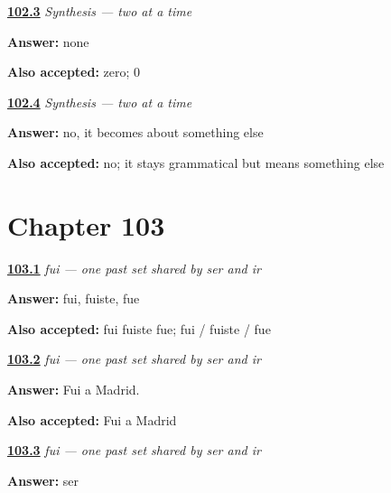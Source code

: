 \noindent\begin{minipage}[t]{\linewidth}
\raggedright
\hyperlink{review-ES-C47-sintesis-dos-a-la-vez-count}{\textbf{102.3}} \emph{Synthesis — two at a time}\par
\small \textbf{Answer:} none\par
\footnotesize \textbf{Also accepted:} zero; 0
\end{minipage}\par\medskip

\noindent\begin{minipage}[t]{\linewidth}
\raggedright
\hyperlink{review-ES-C47-sintesis-dos-a-la-vez-cost}{\textbf{102.4}} \emph{Synthesis — two at a time}\par
\small \textbf{Answer:} no, it becomes about something else\par
\footnotesize \textbf{Also accepted:} no; it stays grammatical but means something else
\end{minipage}\par\medskip

\section*{Chapter 103}

\noindent\begin{minipage}[t]{\linewidth}
\raggedright
\hyperlink{review-ES-C14-ser-ir-preterite-singular-forms}{\textbf{103.1}} \emph{fui — one past set shared by ser and ir}\par
\small \textbf{Answer:} fui, fuiste, fue\par
\footnotesize \textbf{Also accepted:} fui fuiste fue; fui / fuiste / fue
\end{minipage}\par\medskip

\noindent\begin{minipage}[t]{\linewidth}
\raggedright
\hyperlink{review-ES-C14-ser-ir-preterite-fui-madrid}{\textbf{103.2}} \emph{fui — one past set shared by ser and ir}\par
\small \textbf{Answer:} Fui a Madrid.\par
\footnotesize \textbf{Also accepted:} Fui a Madrid
\end{minipage}\par\medskip

\noindent\begin{minipage}[t]{\linewidth}
\raggedright
\hyperlink{review-ES-C14-ser-ir-preterite-context}{\textbf{103.3}} \emph{fui — one past set shared by ser and ir}\par
\small \textbf{Answer:} ser\par
\end{minipage}\par\medskip

